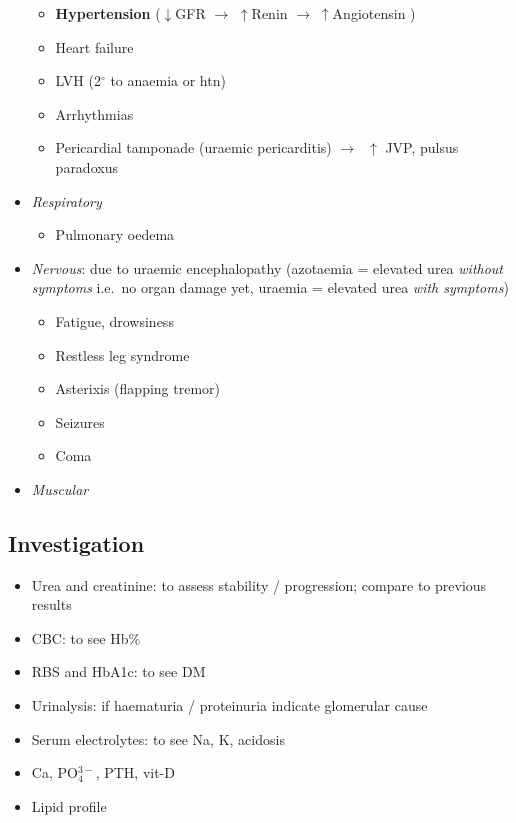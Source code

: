 \documentclass[
  12pt,
]{memoir}
\providecommand{\tightlist}{%
  \setlength{\itemsep}{0pt}\setlength{\parskip}{0pt}}
\begin{document}
\begin{itemize}
  \begin{itemize}
  \tightlist
  \item
    \textbf{Hypertension} (\(\downarrow\)GFR \(\rightarrow\)
    \(\uparrow\)Renin \(\rightarrow\;\uparrow\)Angiotensin )
  \item
    Heart failure
  \item
    LVH (2\(^{\circ}\) to anaemia or htn)
  \item
    Arrhythmias
  \item
    Pericardial tamponade (uraemic pericarditis)
    \(\rightarrow\;\;\uparrow\) JVP, pulsus paradoxus
  \end{itemize}
\item
  \emph{Respiratory}

  \begin{itemize}
  \tightlist
  \item
    Pulmonary oedema
  \end{itemize}
\item
  \emph{Nervous}: due to uraemic encephalopathy (azotaemia = elevated
  urea \emph{without symptoms} i.e.~no organ damage yet, uraemia =
  elevated urea \emph{with symptoms})

  \begin{itemize}
  \tightlist
  \item
    Fatigue, drowsiness
  \item
    Restless leg syndrome
  \item
    Asterixis (flapping tremor)
  \item
    Seizures
  \item
    Coma
  \end{itemize}
\item
  \emph{Muscular}
\end{itemize}

\hypertarget{investigation-26}{%
\subsection{Investigation}\label{investigation-26}}

\begin{itemize}
\tightlist
\item
  Urea and creatinine: to assess stability / progression; compare to
  previous results
\item
  CBC: to see Hb\%
\item
  RBS and HbA1c: to see DM
\item
  Urinalysis: if haematuria / proteinuria indicate glomerular cause
\item
  Serum electrolytes: to see Na, K, acidosis
\item
  Ca, PO\(_4^{3-}\), PTH, vit-D
\item
  Lipid profile
\end{itemize}
\end{document}
